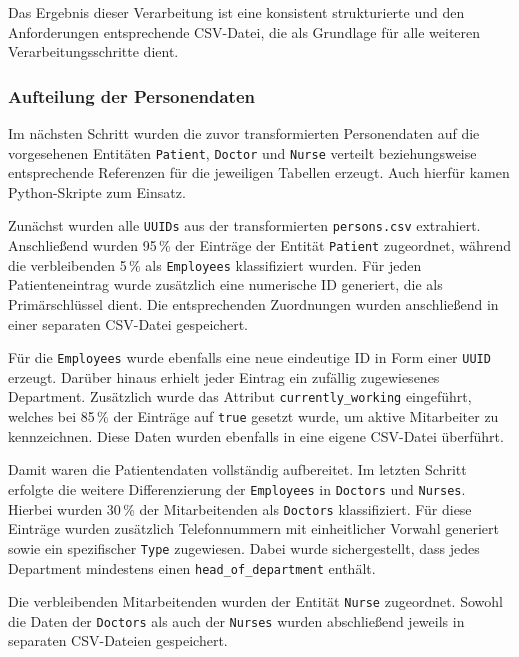 Das Ergebnis dieser Verarbeitung ist eine konsistent strukturierte und den Anforderungen entsprechende CSV-Datei, die als Grundlage für alle weiteren Verarbeitungsschritte dient.

\subsubsection{Aufteilung der Personendaten}
Im nächsten Schritt wurden die zuvor transformierten Personendaten auf die vorgesehenen Entitäten \texttt{Patient}, \texttt{Doctor} und \texttt{Nurse} verteilt beziehungsweise entsprechende Referenzen für die jeweiligen Tabellen erzeugt. Auch hierfür kamen Python-Skripte zum Einsatz.

Zunächst wurden alle \texttt{UUIDs} aus der transformierten \texttt{persons.csv} extrahiert. Anschließend wurden 95\,\% der Einträge der Entität \texttt{Patient} zugeordnet, während die verbleibenden 5\,\% als \texttt{Employees} klassifiziert wurden. Für jeden Patienteneintrag wurde zusätzlich eine numerische ID generiert, die als Primärschlüssel dient. Die entsprechenden Zuordnungen wurden anschließend in einer separaten CSV-Datei gespeichert.

Für die \texttt{Employees} wurde ebenfalls eine neue eindeutige ID in Form einer \texttt{UUID} erzeugt. Darüber hinaus erhielt jeder Eintrag ein zufällig zugewiesenes Department. Zusätzlich wurde das Attribut \texttt{currently\_working} eingeführt, welches bei 85\,\% der Einträge auf \texttt{true} gesetzt wurde, um aktive Mitarbeiter zu kennzeichnen. Diese Daten wurden ebenfalls in eine eigene CSV-Datei überführt.

Damit waren die Patientendaten vollständig aufbereitet. Im letzten Schritt erfolgte die weitere Differenzierung der \texttt{Employees} in \texttt{Doctors} und \texttt{Nurses}. Hierbei wurden 30\,\% der Mitarbeitenden als \texttt{Doctors} klassifiziert. Für diese Einträge wurden zusätzlich Telefonnummern mit einheitlicher Vorwahl generiert sowie ein spezifischer \texttt{Type} zugewiesen. Dabei wurde sichergestellt, dass jedes Department mindestens einen \texttt{head\_of\_department} enthält.

Die verbleibenden Mitarbeitenden wurden der Entität \texttt{Nurse} zugeordnet. Sowohl die Daten der \texttt{Doctors} als auch der \texttt{Nurses} wurden abschließend jeweils in separaten CSV-Dateien gespeichert.